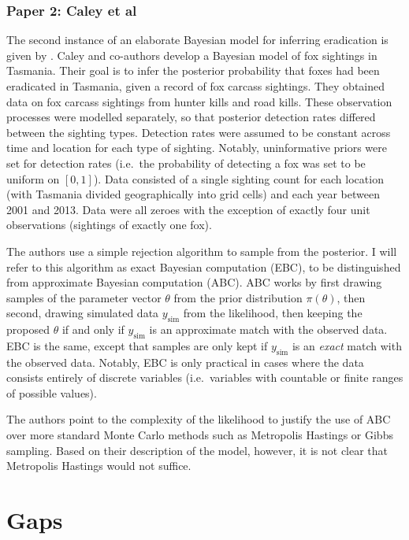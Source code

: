 \documentclass[
]{book}
\begin{document}
\hypertarget{paper-2-caley-et-al}{%
\subsubsection{Paper 2: Caley et al}\label{paper-2-caley-et-al}}

The second instance of an elaborate Bayesian model for inferring eradication is given by \citet{caley2015}. Caley and co-authors develop a Bayesian model of fox sightings in Tasmania. Their goal is to infer the posterior probability that foxes had been eradicated in Tasmania, given a record of fox carcass sightings. They obtained data on fox carcass sightings from hunter kills and road kills. These observation processes were modelled separately, so that posterior detection rates differed between the sighting types. Detection rates were assumed to be constant across time and location for each type of sighting. Notably, uninformative priors were set for detection rates (i.e.~the probability of detecting a fox was set to be uniform on \([0, 1]\)). Data consisted of a single sighting count for each location (with Tasmania divided geographically into grid cells) and each year between 2001 and 2013. Data were all zeroes with the exception of exactly four unit observations (sightings of exactly one fox).

The authors use a simple rejection algorithm to sample from the posterior. I will refer to this algorithm as exact Bayesian computation (EBC), to be distinguished from approximate Bayesian computation (ABC). ABC works by first drawing samples of the parameter vector \(\theta\) from the prior distribution \(\pi(\theta)\), then second, drawing simulated data \(y_{\text{sim}}\) from the likelihood, then keeping the proposed \(\theta\) if and only if \(y_{\text{sim}}\) is an approximate match with the observed data. EBC is the same, except that samples are only kept if \(y_{\text{sim}}\) is an \emph{exact} match with the observed data. Notably, EBC is only practical in cases where the data consists entirely of discrete variables (i.e.~variables with countable or finite ranges of possible values).

The authors point to the complexity of the likelihood to justify the use of ABC over more standard Monte Carlo methods such as Metropolis Hastings or Gibbs sampling. Based on their description of the model, however, it is not clear that Metropolis Hastings would not suffice.

\hypertarget{gaps}{%
\section{Gaps}\label{gaps}}
\end{document}
